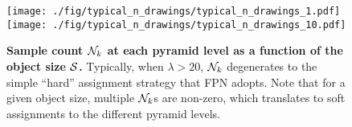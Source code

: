  
 

\begin{figure}[t]
    \begin{center}
    \texttt{[image: ./fig/typical\_n\_drawings/typical\_n\_drawings\_1.pdf]}
    \texttt{[image: ./fig/typical\_n\_drawings/typical\_n\_drawings\_10.pdf]}
    \end{center}
    \vspace{-7mm}
    \caption{{\bf Sample count ${\cal N}_k$  at each pyramid level as a function of the object size ${\cal S}$.}
    Typically, when $\lambda > 20$, ${\cal N}_k$ degenerates to the simple ``hard'' assignment strategy that FPN adopts. Note that for a given object size, multiple ${\cal N}_k$s are non-zero, which translates to soft assignments to the different pyramid levels.
    }
    \label{fig:typical_k_drawings}
\end{figure}
